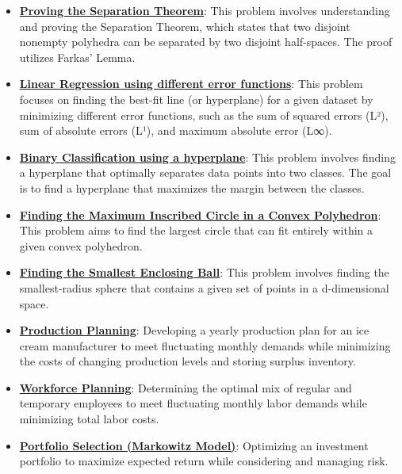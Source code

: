 \documentclass{article}%
\begin{document}
\begin{itemize}[leftmargin=*]
\item \href{https://www.math.purdue.edu/~yipn/421/2024-10-22-Convexity.pdf#page=10}{\textbf{Proving the Separation Theorem}}: This problem involves understanding and proving the Separation Theorem, which states that two disjoint nonempty polyhedra can be separated by two disjoint half-spaces. The proof utilizes Farkas' Lemma. %
\item \href{https://www.math.purdue.edu/~yipn/421/2024-10-22-Regression.pdf#page=1}{\textbf{Linear Regression using different error functions}}: This problem focuses on finding the best-fit line (or hyperplane) for a given dataset by minimizing different error functions, such as the sum of squared errors (L²), sum of absolute errors (L¹), and maximum absolute error (L∞). %
\item \href{https://www.math.purdue.edu/~yipn/421/2024-10-22-Regression.pdf#page=7}{\textbf{Binary Classification using a hyperplane}}: This problem involves finding a hyperplane that optimally separates data points into two classes. The goal is to find a hyperplane that maximizes the margin between the classes. %
\item \href{https://www.math.purdue.edu/~yipn/421/2024-10-22-Regression.pdf#page=15}{\textbf{Finding the Maximum Inscribed Circle in a Convex Polyhedron}}: This problem aims to find the largest circle that can fit entirely within a given convex polyhedron. %
\item \href{https://www.math.purdue.edu/~yipn/421/2024-10-22-Regression.pdf#page=22}{\textbf{Finding the Smallest Enclosing Ball}}: This problem involves finding the smallest-radius sphere that contains a given set of points in a d-dimensional space. %
\item \href{https://www.math.purdue.edu/~yipn/421/2024-10-28-ApplsLinProg.pdf#page=1}{\textbf{Production Planning}}: Developing a yearly production plan for an ice cream manufacturer to meet fluctuating monthly demands while minimizing the costs of changing production levels and storing surplus inventory. %
\item \href{https://www.math.purdue.edu/~yipn/421/2024-10-28-ApplsLinProg.pdf#page=7}{\textbf{Workforce Planning}}: Determining the optimal mix of regular and temporary employees to meet fluctuating monthly labor demands while minimizing total labor costs. %
\item \href{https://www.math.purdue.edu/~yipn/421/2024-10-28-ApplsLinProg.pdf#page=9}{\textbf{Portfolio Selection (Markowitz Model)}}: Optimizing an investment portfolio to maximize expected return while considering and managing risk. %

\end{itemize}
\end{document}
